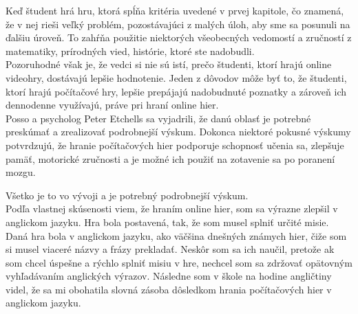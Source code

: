 \documentclass[10pt,slovak,a4paper]{article}
\begin{document}
\indent Keď študent hrá hru, ktorá spĺňa kritéria uvedené v prvej kapitole, čo znamená, že v nej rieši veľký problém, pozostávajúci z malých úloh, aby sme sa posunuli na ďalšiu úroveň. To zahŕňa použitie niektorých všeobecných vedomostí a zručností z matematiky, prírodných vied, histórie, ktoré ste nadobudli. \\
\indent Pozoruhodné však je, že vedci si nie sú istí, prečo študenti, ktorí hrajú online videohry, dostávajú lepšie hodnotenie. Jeden z dôvodov môže byť to, že študenti, ktorí hrajú počítačové hry, lepšie prepájajú nadobudnuté poznatky a zároveň ich dennodenne využívajú, práve pri hraní online hier. \\ 	
\indent Posso a psycholog Peter Etchells sa vyjadrili, že danú oblasť je potrebné preskúmať a zrealizovať podrobnejší výskum. Dokonca niektoré pokusné výskumy potvrdzujú, že hranie počítačových hier podporuje schopnosť učenia sa, zlepšuje pamäť, motorické zručnosti a je možné ich použiť na zotavenie sa po poranení mozgu.
\cite{cite7}

Všetko je to vo vývoji a je potrebný podrobnejší výskum. \\
	\indent Podľa vlastnej skúsenosti viem, že hraním online hier, som sa výrazne zlepšil v anglickom jazyku. Hra bola postavená, tak, že som musel splniť určité misie. Daná hra bola v anglickom jazyku, ako väčšina dnešných známych hier, čiže som si musel viaceré názvy a frázy prekladať. Neskôr som sa ich naučil, pretože ak som chcel úspešne a rýchlo splniť misiu v hre, nechcel som sa zdržovať opätovným vyhľadávaním anglických výrazov. Následne som v škole na hodine angličtiny videl, že sa mi obohatila slovná zásoba dôsledkom hrania počítačových hier v anglickom jazyku. 
\end{document}

